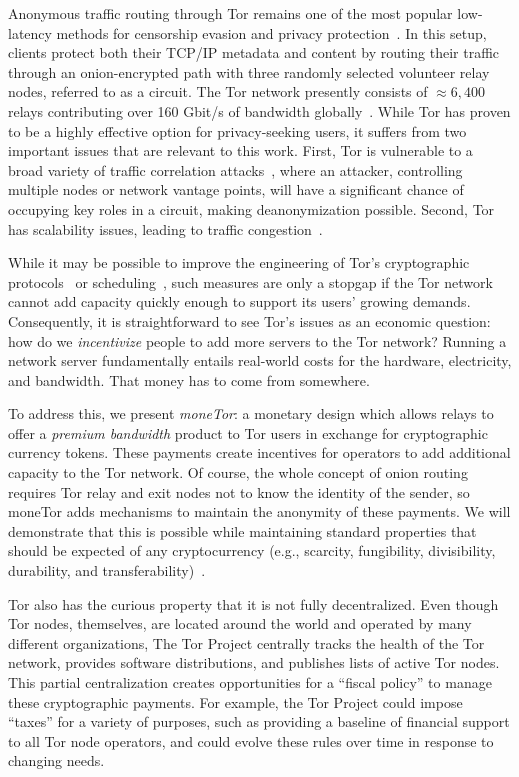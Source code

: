 Anonymous traffic routing through Tor remains one of the most popular low-latency methods for censorship evasion and privacy protection~\cite{dingledine2004tor}.
In this setup, clients protect both their TCP/IP metadata and content by routing their traffic through an onion-encrypted path with three randomly selected volunteer relay nodes, referred to as a circuit.
The Tor network presently consists of $\approx 6,400$ relays contributing over 160 Gbit/s of bandwidth globally~\cite{portal2018tormetrics}.
While Tor has proven to be a highly effective option for privacy-seeking users, it suffers from two important issues that are relevant to this work.
First, Tor is vulnerable to a broad variety of traffic correlation attacks~\cite{wright2004predecessor,murdoch2005low}, where an attacker, controlling multiple nodes or network vantage points, will have a significant chance of occupying key roles in a circuit, making deanonymization possible.
Second, Tor has scalability issues, leading to traffic congestion~\cite{portal2018tormetrics, alsabah2016performance}.

While it may be possible to improve the engineering of Tor's cryptographic protocols~\cite{reardon2009improving} or scheduling~\cite{jansen2014never}, such measures are only a stopgap if the Tor network cannot add capacity quickly enough to support its users' growing demands.
Consequently, it is straightforward to see Tor's issues as an economic question: how do we {\em incentivize} people to add more servers to the Tor network?
Running a network server fundamentally entails real-world costs for the hardware, electricity, and bandwidth.
That money has to come from somewhere.

To address this, we present {\em moneTor}: a monetary design which allows relays to offer a \emph{premium bandwidth} product to Tor users in exchange for cryptographic currency tokens.
These payments create incentives for operators to add additional capacity to the Tor network.
Of course, the whole concept of onion routing requires Tor relay and exit nodes not to know the identity of the sender, so moneTor adds mechanisms to maintain the anonymity of these payments.
We will demonstrate that this is possible while maintaining standard properties that should be expected of any cryptocurrency (e.g., scarcity, fungibility, divisibility, durability, and transferability)~\cite[p.3]{crump2011phenomenon}.

Tor also has the curious property that it is not fully decentralized.
Even though Tor nodes, themselves, are located around the world and operated by many different organizations, The Tor Project centrally tracks the health of the Tor network, provides software distributions, and publishes lists of active Tor nodes.
This partial centralization creates opportunities for a ``fiscal policy'' to manage these cryptographic payments.
For example, the Tor Project could impose ``taxes'' for a variety of purposes, such as providing a baseline of financial support to all Tor node operators, and could evolve these rules over time in response to changing needs.

